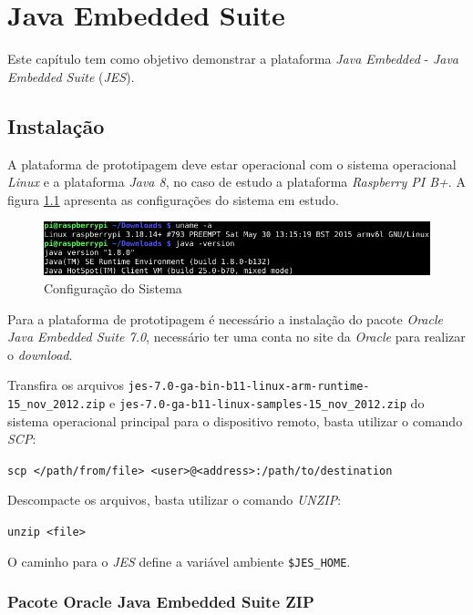 %

\chapter{Java Embedded Suite}

Este capítulo tem como objetivo demonstrar a plataforma \textit{Java Embedded}
- \textit{Java Embedded Suite} (\textit{JES}).

\section{Instalação}

A plataforma de prototipagem deve estar operacional com o sistema operacional
\textit{Linux} e a plataforma \textit{Java 8}, no caso de estudo a plataforma
\textit{Raspberry PI B+}. A figura \ref{fig:jes/configuracao} apresenta as
configurações do sistema em estudo.

\begin{figure}[H]
    \centering
    \includegraphics[width=0.7\linewidth]{figuras/java/configuracao}
    \caption{Configuração do Sistema}
    \label{fig:jes/configuracao}
\end{figure}

Para a plataforma de prototipagem é necessário a instalação do pacote
\textit{Oracle Java Embedded Suite 7.0}, necessário ter uma conta no site da
\textit{Oracle} para realizar o \textit{download}.

Transfira os arquivos \newline
\verb|jes-7.0-ga-bin-b11-linux-arm-runtime-15_nov_2012.zip|
 e \newline
\verb|jes-7.0-ga-b11-linux-samples-15_nov_2012.zip|
 do sistema operacional principal para o dispositivo remoto, basta
utilizar o comando
\textit{SCP}:

\verb|scp </path/from/file> <user>@<address>:/path/to/destination|

Descompacte os arquivos, basta utilizar o comando \textit{UNZIP}:

\verb|unzip <file>|

O caminho para o \textit{JES} define a variável ambiente \verb|$JES_HOME|.

\subsection{Pacote Oracle Java Embedded Suite ZIP}

